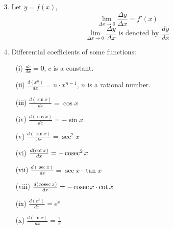 3. Let $y = f(x)$,
   \[
   \lim_{\Delta x \to 0} \frac{\Delta y}{\Delta x} = f'(x)
   \]
   \[
   \lim_{\Delta x \to 0} \frac{\Delta y}{\Delta x} \text{ is denoted by } \frac{dy}{dx}
   \]

4. Differential coefficients of some functions:
   \begin{itemize}
   \item[(i)] $\frac{dc}{dx} = 0$, $c$ is a constant.
   \item[(ii)] $\frac{d(x^n)}{dx} = n \cdot x^{n-1}$, $n$ is a rational number.
   \item[(iii)] $\frac{d(\sin x)}{dx} = \cos x$
   \item[(iv)] $\frac{d(\cos x)}{dx} = -\sin x$
   \item[(v)] $\frac{d(\tan x)}{dx} = \sec^2 x$
   \item[(vi)] $\frac{d(\cot x)}{dx} = -\operatorname{cosec}^2 x$
   \item[(vii)] $\frac{d(\sec x)}{dx} = \sec x \cdot \tan x$
   \item[(viii)] $\frac{d(\operatorname{cosec} x)}{dx} = -\operatorname{cosec} x \cdot \cot x$
   \item[(ix)] $\frac{d(e^x)}{dx} = e^x$
   \item[(x)] $\frac{d(\ln x)}{dx} = \frac{1}{x}$
   \end{itemize}
   

